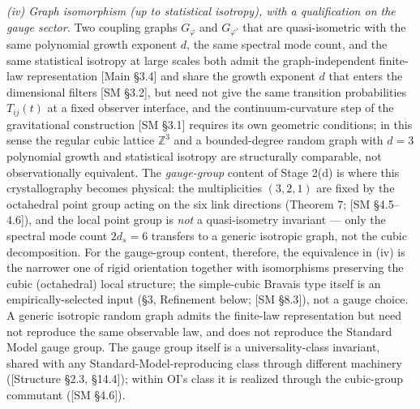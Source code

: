 \documentclass[
]{article}
\begin{document}
\emph{(iv) Graph isomorphism (up to statistical isotropy), with a
qualification on the gauge sector.} Two coupling graphs \(G_\varphi\)
and \(G_{\varphi'}\) that are quasi-isometric with the same polynomial
growth exponent \(d\), the same spectral mode count, and the same
statistical isotropy at large scales both admit the graph-independent
finite-law representation {[}Main §3.4{]} and share the growth exponent
\(d\) that enters the dimensional filters {[}SM §3.2{]}, but need not
give the same transition probabilities \(T_{ij}(t)\) at a fixed observer
interface, and the continuum-curvature step of the gravitational
construction {[}SM §3.1{]} requires its own geometric conditions; in
this sense the regular cubic lattice \(\mathbb{Z}^3\) and a
bounded-degree random graph with \(d = 3\) polynomial growth and
statistical isotropy are structurally comparable, not observationally
equivalent. The \emph{gauge-group} content of Stage 2(d) is where this
crystallography becomes physical: the multiplicities \((3,2,1)\) are
fixed by the octahedral point group acting on the six link directions
(Theorem 7; {[}SM §4.5--4.6{]}), and the local point group is \emph{not}
a quasi-isometry invariant --- only the spectral mode count \(2d_s = 6\)
transfers to a generic isotropic graph, not the cubic decomposition. For
the gauge-group content, therefore, the equivalence in (iv) is the
narrower one of rigid orientation together with isomorphisms preserving
the cubic (octahedral) local structure; the simple-cubic Bravais type
itself is an empirically-selected input (§3, Refinement below; {[}SM
§8.3{]}), not a gauge choice. A generic isotropic random graph admits
the finite-law representation but need not reproduce the same observable
law, and does not reproduce the Standard Model gauge group. The gauge
group itself is a universality-class invariant, shared with any
Standard-Model-reproducing class through different machinery
({[}Structure §2.3, §14.4{]}); within OI's class it is realized through
the cubic-group commutant ({[}SM §4.6{]}).
\end{document}

